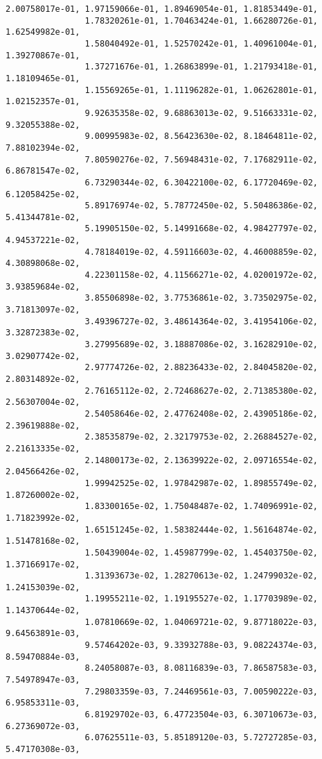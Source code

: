 \documentclass[11pt]{article}
\begin{document}
\begin{Verbatim}[commandchars=\\\{\}]
                2.00758017e-01, 1.97159066e-01, 1.89469054e-01, 1.81853449e-01,
                1.78320261e-01, 1.70463424e-01, 1.66280726e-01, 1.62549982e-01,
                1.58040492e-01, 1.52570242e-01, 1.40961004e-01, 1.39270867e-01,
                1.37271676e-01, 1.26863899e-01, 1.21793418e-01, 1.18109465e-01,
                1.15569265e-01, 1.11196282e-01, 1.06262801e-01, 1.02152357e-01,
                9.92635358e-02, 9.68863013e-02, 9.51663331e-02, 9.32055388e-02,
                9.00995983e-02, 8.56423630e-02, 8.18464811e-02, 7.88102394e-02,
                7.80590276e-02, 7.56948431e-02, 7.17682911e-02, 6.86781547e-02,
                6.73290344e-02, 6.30422100e-02, 6.17720469e-02, 6.12058425e-02,
                5.89176974e-02, 5.78772450e-02, 5.50486386e-02, 5.41344781e-02,
                5.19905150e-02, 5.14991668e-02, 4.98427797e-02, 4.94537221e-02,
                4.78184019e-02, 4.59116603e-02, 4.46008859e-02, 4.30898068e-02,
                4.22301158e-02, 4.11566271e-02, 4.02001972e-02, 3.93859684e-02,
                3.85506898e-02, 3.77536861e-02, 3.73502975e-02, 3.71813097e-02,
                3.49396727e-02, 3.48614364e-02, 3.41954106e-02, 3.32872383e-02,
                3.27995689e-02, 3.18887086e-02, 3.16282910e-02, 3.02907742e-02,
                2.97774726e-02, 2.88236433e-02, 2.84045820e-02, 2.80314892e-02,
                2.76165112e-02, 2.72468627e-02, 2.71385380e-02, 2.56307004e-02,
                2.54058646e-02, 2.47762408e-02, 2.43905186e-02, 2.39619888e-02,
                2.38535879e-02, 2.32179753e-02, 2.26884527e-02, 2.21613335e-02,
                2.14800173e-02, 2.13639922e-02, 2.09716554e-02, 2.04566426e-02,
                1.99942525e-02, 1.97842987e-02, 1.89855749e-02, 1.87260002e-02,
                1.83300165e-02, 1.75048487e-02, 1.74096991e-02, 1.71823992e-02,
                1.65151245e-02, 1.58382444e-02, 1.56164874e-02, 1.51478168e-02,
                1.50439004e-02, 1.45987799e-02, 1.45403750e-02, 1.37166917e-02,
                1.31393673e-02, 1.28270613e-02, 1.24799032e-02, 1.24153039e-02,
                1.19955211e-02, 1.19195527e-02, 1.17703989e-02, 1.14370644e-02,
                1.07810669e-02, 1.04069721e-02, 9.87718022e-03, 9.64563891e-03,
                9.57464202e-03, 9.33932788e-03, 9.08224374e-03, 8.59470884e-03,
                8.24058087e-03, 8.08116839e-03, 7.86587583e-03, 7.54978947e-03,
                7.29803359e-03, 7.24469561e-03, 7.00590222e-03, 6.95853311e-03,
                6.81929702e-03, 6.47723504e-03, 6.30710673e-03, 6.27369072e-03,
                6.07625511e-03, 5.85189120e-03, 5.72727285e-03, 5.47170308e-03,

\end{Verbatim}
\end{document}
